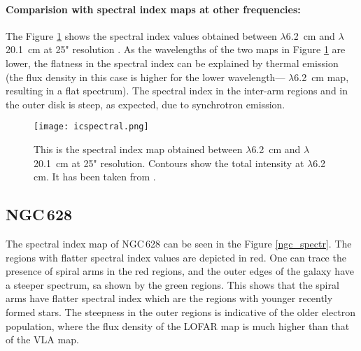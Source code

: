 \documentclass[../main/thesis_msc.tex]{subfiles}
\begin{document}
\paragraph{Comparision with spectral index maps at other frequencies:}The Figure \ref{specic} shows the spectral index values obtained between $\lambda$6.2~cm and $\lambda$20.1~cm at 25" resolution \citep{2015A&A...578A..93B}. As the wavelengths of the two maps in Figure \ref{specic} are lower, the flatness in the spectral index can be explained by thermal emission (the flux density in this case is higher for the lower wavelength--- $\lambda$6.2~cm map, resulting in a flat spectrum). The spectral index in the inter-arm regions and in the outer disk is steep, as expected, due to synchrotron emission.

\begin{figure}
\centering
\texttt{[image: icspectral.png]}
\caption{This is the spectral index map obtained between $\lambda$6.2~cm and $\lambda$20.1~cm at 25" resolution. Contours show the total intensity at $\lambda$6.2 cm. It has been taken from \citet{2015A&A...578A..93B}.}
\label{specic}
\end{figure}

\subsection{NGC\,628}

\noindent The spectral index map of NGC\,628 can be seen in the Figure \ref{ngc_spectr}. The regions with flatter spectral index values are depicted in red. One can trace the presence of spiral arms in the red regions, and the outer edges of the galaxy have a steeper spectrum, sa shown by the green regions. This shows that the spiral arms have flatter spectral index which are the regions with younger recently formed stars. The steepness in the outer regions is indicative of the older electron population, where the flux density of the LOFAR map is much higher than that of the VLA map.\\
\end{document}
